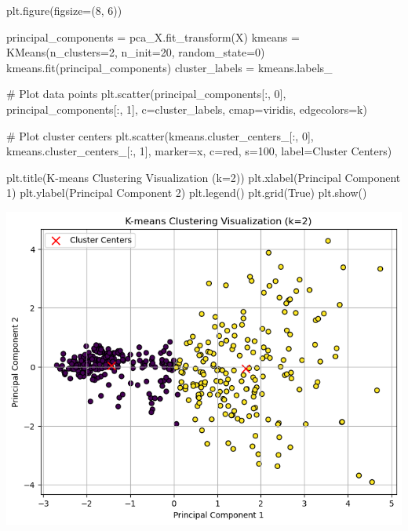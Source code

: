 \documentclass[
  11pt,
  letterpaper,
  DIV=11,
  numbers=noendperiod]{scrartcl}
\newenvironment{Shaded}{\begin{snugshade}}{\end{snugshade}}
\newcommand{\CommentTok}[1]{\textcolor[rgb]{0.37,0.37,0.37}{#1}}
\newcommand{\DecValTok}[1]{\textcolor[rgb]{0.68,0.00,0.00}{#1}}
\newcommand{\NormalTok}[1]{\textcolor[rgb]{0.00,0.23,0.31}{#1}}
\newcommand{\OperatorTok}[1]{\textcolor[rgb]{0.37,0.37,0.37}{#1}}
\newcommand{\StringTok}[1]{\textcolor[rgb]{0.13,0.47,0.30}{#1}}
\newcommand{\VariableTok}[1]{\textcolor[rgb]{0.07,0.07,0.07}{#1}}
\begin{document}
\begin{Shaded}
\begin{Highlighting}[]
\NormalTok{plt.figure(figsize}\OperatorTok{=}\NormalTok{(}\DecValTok{8}\NormalTok{, }\DecValTok{6}\NormalTok{))}

\NormalTok{principal\_components }\OperatorTok{=}\NormalTok{ pca\_X.fit\_transform(X)}
\NormalTok{kmeans }\OperatorTok{=}\NormalTok{ KMeans(n\_clusters}\OperatorTok{=}\DecValTok{2}\NormalTok{, n\_init}\OperatorTok{=}\DecValTok{20}\NormalTok{, random\_state}\OperatorTok{=}\DecValTok{0}\NormalTok{)}
\NormalTok{kmeans.fit(principal\_components)}
\NormalTok{cluster\_labels }\OperatorTok{=}\NormalTok{ kmeans.labels\_}

\CommentTok{\# Plot data points}
\NormalTok{plt.scatter(principal\_components[:, }\DecValTok{0}\NormalTok{], principal\_components[:, }\DecValTok{1}\NormalTok{], c}\OperatorTok{=}\NormalTok{cluster\_labels, cmap}\OperatorTok{=}\StringTok{\textquotesingle{}viridis\textquotesingle{}}\NormalTok{, edgecolors}\OperatorTok{=}\StringTok{\textquotesingle{}k\textquotesingle{}}\NormalTok{)}

\CommentTok{\# Plot cluster centers}
\NormalTok{plt.scatter(kmeans.cluster\_centers\_[:, }\DecValTok{0}\NormalTok{], kmeans.cluster\_centers\_[:, }\DecValTok{1}\NormalTok{], marker}\OperatorTok{=}\StringTok{\textquotesingle{}x\textquotesingle{}}\NormalTok{, c}\OperatorTok{=}\StringTok{\textquotesingle{}red\textquotesingle{}}\NormalTok{, s}\OperatorTok{=}\DecValTok{100}\NormalTok{, label}\OperatorTok{=}\StringTok{\textquotesingle{}Cluster Centers\textquotesingle{}}\NormalTok{)}

\NormalTok{plt.title(}\StringTok{\textquotesingle{}K{-}means Clustering Visualization (k=2)\textquotesingle{}}\NormalTok{)}
\NormalTok{plt.xlabel(}\StringTok{\textquotesingle{}Principal Component 1\textquotesingle{}}\NormalTok{)}
\NormalTok{plt.ylabel(}\StringTok{\textquotesingle{}Principal Component 2\textquotesingle{}}\NormalTok{)}
\NormalTok{plt.legend()}
\NormalTok{plt.grid(}\VariableTok{True}\NormalTok{)}
\NormalTok{plt.show()}
\end{Highlighting}
\end{Shaded}

\includegraphics{assignment6111_files/figure-pdf/cell-37-output-1.png}
\end{document}
